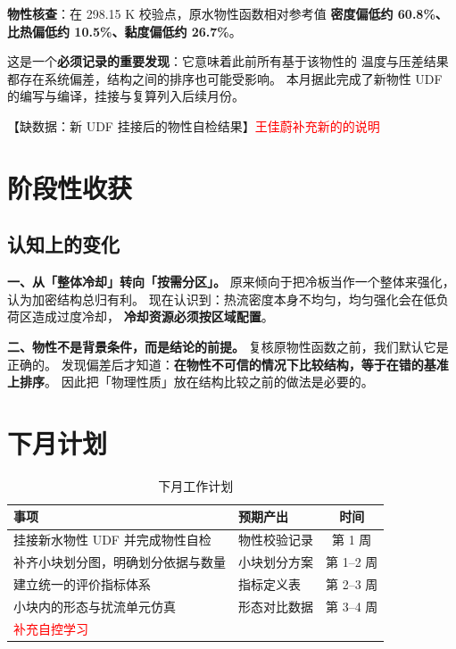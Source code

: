 \documentclass[stage1,fontset=fandol]{ydzjreport}
\begin{document}
	
	
	\textbf{物性核查}：在 298.15 K 校验点，原水物性函数相对参考值
	\textbf{密度偏低约 60.8\%、比热偏低约 10.5\%、黏度偏低约 26.7\%}。
	
	这是一个\textbf{必须记录的重要发现}：它意味着此前所有基于该物性的
	温度与压差结果都存在系统偏差，结构之间的排序也可能受影响。
	本月据此完成了新物性 UDF 的编写与编译，挂接与复算列入后续月份。
	
	【缺数据：新 UDF 挂接后的物性自检结果】\textcolor{red}{王佳蔚补充新的的说明}
	
	\section{阶段性收获}
	
	\subsection{认知上的变化}
	
	\textbf{一、从「整体冷却」转向「按需分区」。}
	原来倾向于把冷板当作一个整体来强化，认为加密结构总归有利。
	现在认识到：热流密度本身不均匀，均匀强化会在低负荷区造成过度冷却，
	\textbf{冷却资源必须按区域配置}。
	
	\textbf{二、物性不是背景条件，而是结论的前提。}
	复核原物性函数之前，我们默认它是正确的。
	发现偏差后才知道：\textbf{在物性不可信的情况下比较结构，等于在错的基准上排序}。
	因此把「物理性质」放在结构比较之前的做法是必要的。
	
	
	
	\section{下月计划}
	
	\begin{table}[H]
		\centering
		\caption{下月工作计划}
		\label{tab:plan}
		\begin{tabularx}{\textwidth}{@{}Y Y c@{}}
			\toprule
			 事项 & 预期产出 & 时间 \\
			\midrule
			挂接新水物性 UDF 并完成物性自检 & 物性校验记录 & 第 1 周 \\
			补齐小块划分图，明确划分依据与数量 & 小块划分方案 & 第 1--2 周 \\
			建立统一的评价指标体系 & 指标定义表 & 第 2--3 周 \\
			小块内的形态与扰流单元仿真 & 形态对比数据 & 第 3--4 周 \\
			\textcolor{red}{补充自控学习}\\
		\end{tabularx}
	\end{table}
	
\end{document}
